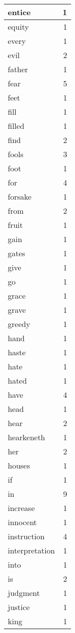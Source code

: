 \begin{center}
\begin{longtable}{l|r}
entice & 1\\ \hline 
equity & 1\\ \hline 
every & 1\\ \hline 
evil & 2\\ \hline 
father & 1\\ \hline 
fear & 5\\ \hline 
feet & 1\\ \hline 
fill & 1\\ \hline 
filled & 1\\ \hline 
find & 2\\ \hline 
fools & 3\\ \hline 
foot & 1\\ \hline 
for & 4\\ \hline 
forsake & 1\\ \hline 
from & 2\\ \hline 
fruit & 1\\ \hline 
gain & 1\\ \hline 
gates & 1\\ \hline 
give & 1\\ \hline 
go & 1\\ \hline 
grace & 1\\ \hline 
grave & 1\\ \hline 
greedy & 1\\ \hline 
hand & 1\\ \hline 
haste & 1\\ \hline 
hate & 1\\ \hline 
hated & 1\\ \hline 
have & 4\\ \hline 
head & 1\\ \hline 
hear & 2\\ \hline 
hearkeneth & 1\\ \hline 
her & 2\\ \hline 
houses & 1\\ \hline 
if & 1\\ \hline 
in & 9\\ \hline 
increase & 1\\ \hline 
innocent & 1\\ \hline 
instruction & 4\\ \hline 
interpretation & 1\\ \hline 
into & 1\\ \hline 
is & 2\\ \hline 
judgment & 1\\ \hline 
justice & 1\\ \hline 
king & 1\\ \hline 

\end{longtable}
\end{center}
